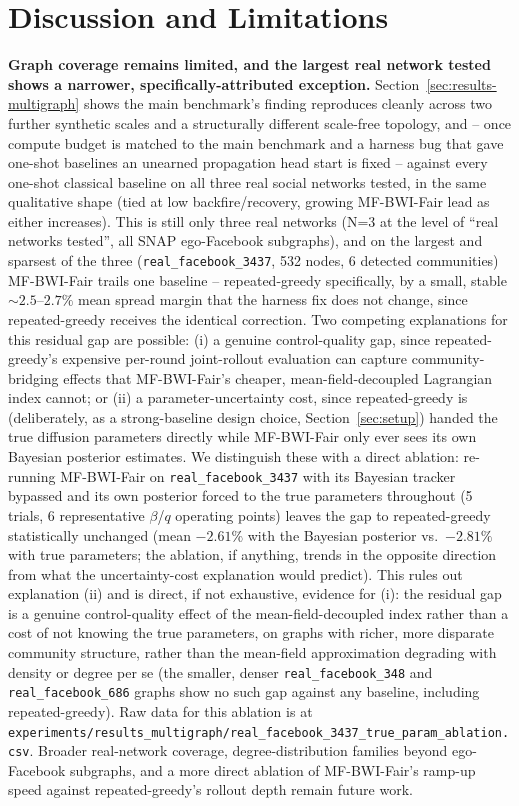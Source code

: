 \documentclass[journal]{IEEEtran}
\begin{document}
\section{Discussion and Limitations}
\label{sec:limitations}

\textbf{Graph coverage remains limited, and the largest real network
tested shows a narrower, specifically-attributed exception.}
Section~\ref{sec:results-multigraph} shows the main benchmark's finding
reproduces cleanly across two further synthetic scales and a structurally
different scale-free topology, and -- once compute budget is matched to
the main benchmark and a harness bug that gave one-shot baselines an
unearned propagation head start is fixed -- against every one-shot
classical baseline on all three real social networks tested, in the same
qualitative shape (tied at low backfire/recovery, growing MF-BWI-Fair
lead as either increases). This is still only three real networks (N=3
at the level of ``real networks tested'', all SNAP ego-Facebook
subgraphs), and on the largest and sparsest of the three
(\texttt{real\_facebook\_3437}, 532 nodes, 6 detected communities)
MF-BWI-Fair trails one baseline -- repeated-greedy specifically, by a
small, stable $\sim\!2.5$--$2.7\%$ mean spread margin that the harness
fix does not change, since repeated-greedy receives the identical
correction. Two competing explanations for this residual gap are
possible: (i) a genuine control-quality gap, since repeated-greedy's
expensive per-round joint-rollout evaluation can capture
community-bridging effects that MF-BWI-Fair's cheaper, mean-field-decoupled
Lagrangian index cannot; or (ii) a parameter-uncertainty cost, since
repeated-greedy is (deliberately, as a strong-baseline design choice,
Section~\ref{sec:setup}) handed the true diffusion parameters directly
while MF-BWI-Fair only ever sees its own Bayesian posterior estimates. We
distinguish these with a direct ablation: re-running MF-BWI-Fair on
\texttt{real\_facebook\_3437} with its Bayesian tracker bypassed and its
own posterior forced to the true parameters throughout (5 trials, 6
representative $\beta$/$q$ operating points) leaves the gap to
repeated-greedy statistically unchanged (mean $-2.61\%$ with the Bayesian
posterior vs.\ $-2.81\%$ with true parameters; the ablation, if anything,
trends in the opposite direction from what the uncertainty-cost
explanation would predict). This rules out explanation (ii) and is
direct, if not exhaustive, evidence for (i): the residual gap is a
genuine control-quality effect of the mean-field-decoupled index rather
than a cost of not knowing the true parameters, on graphs with richer,
more disparate community structure, rather than the mean-field
approximation degrading with density or degree per se (the smaller,
denser \texttt{real\_facebook\_348} and \texttt{real\_facebook\_686}
graphs show no such gap against any baseline, including repeated-greedy).
Raw data for this ablation is at
\texttt{experiments/results\_multigraph/real\_facebook\_3437\_true\_param\_ablation.csv}.
Broader real-network coverage, degree-distribution families beyond
ego-Facebook subgraphs, and a more direct ablation of MF-BWI-Fair's
ramp-up speed against repeated-greedy's rollout depth remain future work.
\end{document}
